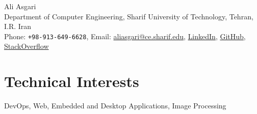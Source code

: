 \documentclass[10pt, a4paper]{article}
\begin{document}
{\LARGE Ali Asgari}\\[1cm]
Department of Computer Engineering, Sharif University of Technology, Tehran, I.R. Iran\\[.2cm]
Phone: \texttt{+98-913-649-6628}, Email: \href{mailto:aliasgari@ce.sharif.edu}{aliasgari@ce.sharif.edu},  \href{https://www.linkedin.com/in/ali-asgari-51981884/}{LinkedIn}, \href{https://github.com/altostratous}{GitHub}, \href{https://stackoverflow.com/users/2656621/ali-asgari?tab=profile}{StackOverflow}\\ 


\section*{Technical Interests}
DevOps, Web, Embedded and Desktop Applications,  Image Processing
\end{document}
